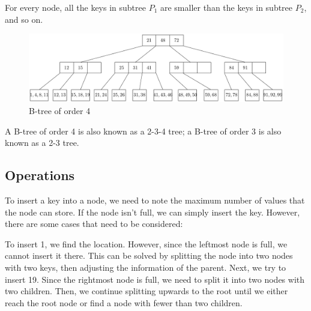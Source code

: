 For every node, all the keys in subtree \(P_1\) are smaller than the keys in subtree \(P_2\), and so on.

\begin{figure}[H]
  \centering
  \includegraphics[width=\textwidth]{Figure/B-Tree.pdf}
  \caption*{B-tree of order 4}
\end{figure}

A B-tree of order 4 is also known as a 2-3-4 tree; a B-tree of order 3 is also known as a 2-3 tree.

\subsection{Operations}
To insert a key into a node, we need to note the maximum number of values that the node can store. If the node isn't full, we can simply insert the key. However, there are some cases that need to be considered:

To insert 1, we find the location. However, since the leftmost node is full, we cannot insert it there. This can be solved by splitting the node into two nodes with two keys, then adjusting the information of the parent. Next, we try to insert 19. Since the rightmost node is full, we need to split it into two nodes with two children. Then, we continue splitting upwards to the root until we either reach the root node or find a node with fewer than two children.

